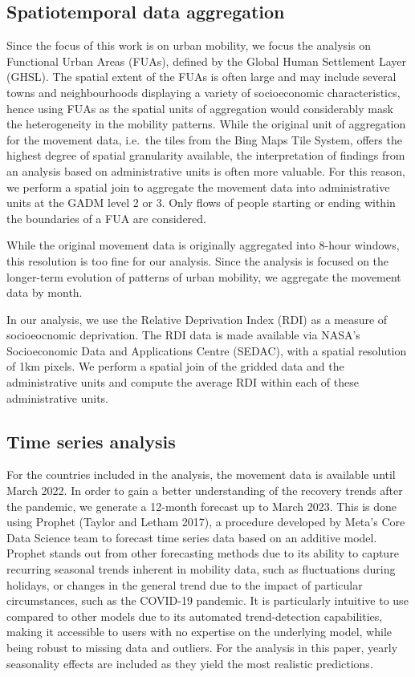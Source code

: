 \documentclass[
  11pt,
]{article}
\begin{document}
\hypertarget{spatiotemporal-data-aggregation}{%
\subsection{Spatiotemporal data
aggregation}\label{spatiotemporal-data-aggregation}}

Since the focus of this work is on urban mobility, we focus the analysis
on Functional Urban Areas (FUAs), defined by the Global Human Settlement
Layer (GHSL). The spatial extent of the FUAs is often large and may
include several towns and neighbourhoods displaying a variety of
socioeconomic characteristics, hence using FUAs as the spatial units of
aggregation would considerably mask the heterogeneity in the mobility
patterns. While the original unit of aggregation for the movement data,
i.e.~the tiles from the Bing Maps Tile System, offers the highest degree
of spatial granularity available, the interpretation of findings from an
analysis based on administrative units is often more valuable. For this
reason, we perform a spatial join to aggregate the movement data into
administrative units at the GADM level 2 or 3. Only flows of people
starting or ending within the boundaries of a FUA are considered.

While the original movement data is originally aggregated into 8-hour
windows, this resolution is too fine for our analysis. Since the
analysis is focused on the longer-term evolution of patterns of urban
mobility, we aggregate the movement data by month.

In our analysis, we use the Relative Deprivation Index (RDI) as a
measure of socioeocnomic deprivation. The RDI data is made available via
NASA's Socioeconomic Data and Applications Centre (SEDAC), with a
spatial resolution of 1km pixels. We perform a spatial join of the
gridded data and the administrative units and compute the average RDI
within each of these administrative units.

\hypertarget{time-series-analysis}{%
\subsection{Time series analysis}\label{time-series-analysis}}

For the countries included in the analysis, the movement data is
available until March 2022. In order to gain a better understanding of
the recovery trends after the pandemic, we generate a 12-month forecast
up to March 2023. This is done using Prophet (Taylor and Letham 2017), a
procedure developed by Meta's Core Data Science team to forecast time
series data based on an additive model. Prophet stands out from other
forecasting methods due to its ability to capture recurring seasonal
trends inherent in mobility data, such as fluctuations during holidays,
or changes in the general trend due to the impact of particular
circumstances, such as the COVID-19 pandemic. It is particularly
intuitive to use compared to other models due to its automated
trend-detection capabilities, making it accessible to users with no
expertise on the underlying model, while being robust to missing data
and outliers. For the analysis in this paper, yearly seasonality effects
are included as they yield the most realistic predictions.
\end{document}
